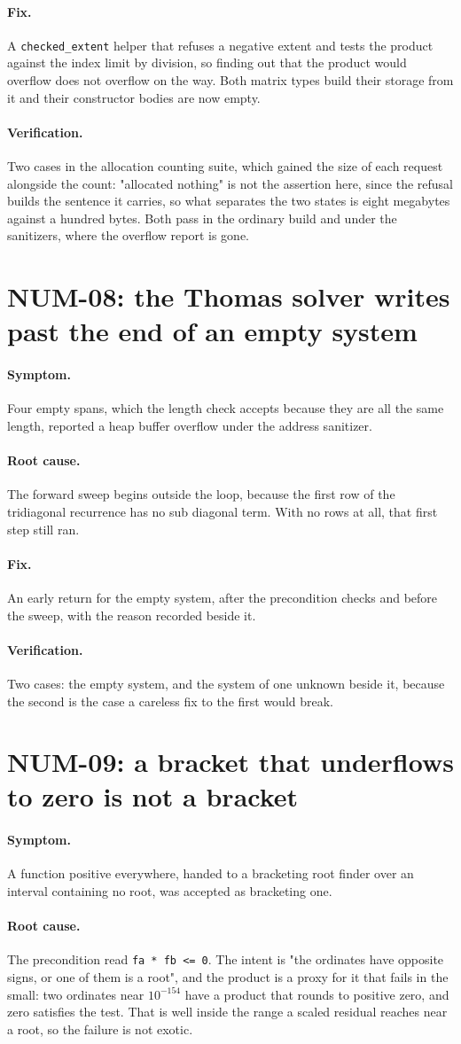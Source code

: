 \documentclass[11pt,a4paper]{report}
\newcommand{\symptom}[1]{\paragraph{Symptom.}#1}
\newcommand{\rootcause}[1]{\paragraph{Root cause.}#1}
\newcommand{\fix}[1]{\paragraph{Fix.}#1}
\newcommand{\verification}[1]{\paragraph{Verification.}#1}
\begin{document}
\fix{A \texttt{checked\_extent} helper that refuses a negative extent and tests
the product against the index limit by division, so finding out that the product
would overflow does not overflow on the way. Both matrix types build their
storage from it and their constructor bodies are now empty.}

\verification{Two cases in the allocation counting suite, which gained the size
of each request alongside the count: "allocated nothing" is not the assertion
here, since the refusal builds the sentence it carries, so what separates the two
states is eight megabytes against a hundred bytes. Both pass in the ordinary
build and under the sanitizers, where the overflow report is gone.}

\section{NUM-08: the Thomas solver writes past the end of an empty system}

\symptom{Four empty spans, which the length check accepts because they are all
the same length, reported a heap buffer overflow under the address sanitizer.}

\rootcause{The forward sweep begins outside the loop, because the first row of
the tridiagonal recurrence has no sub diagonal term. With no rows at all, that
first step still ran.}

\fix{An early return for the empty system, after the precondition checks and
before the sweep, with the reason recorded beside it.}

\verification{Two cases: the empty system, and the system of one unknown beside
it, because the second is the case a careless fix to the first would break.}

\section{NUM-09: a bracket that underflows to zero is not a bracket}

\symptom{A function positive everywhere, handed to a bracketing root finder over
an interval containing no root, was accepted as bracketing one.}

\rootcause{The precondition read \texttt{fa * fb <= 0}. The intent is "the
ordinates have opposite signs, or one of them is a root", and the product is a
proxy for it that fails in the small: two ordinates near $10^{-154}$ have a
product that rounds to positive zero, and zero satisfies the test. That is well
inside the range a scaled residual reaches near a root, so the failure is not
exotic.}
\end{document}
